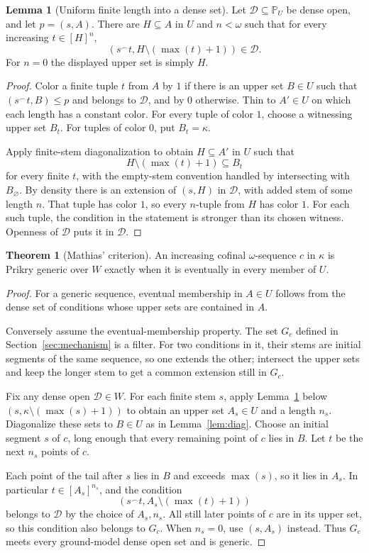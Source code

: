 \documentclass[11pt,letterpaper]{article}
\theoremstyle{definition}
\newtheorem{theorem}[definition]{Theorem}
\newtheorem{lemma}[definition]{Lemma}
\numberwithin{equation}{section}
\begin{document}
\begin{lemma}[Uniform finite length into a dense set]\label{lem:strongprikry}
Let $\mathcal D\subseteq\mathbb P_U$ be dense open, and let $p=(s,A)$. There are $H\subseteq A$ in $U$ and $n<\omega$ such that for every increasing $t\in[H]^n$,
\[
 (s^\frown t,H\setminus(\max(t)+1))\in\mathcal D.
\]
For $n=0$ the displayed upper set is simply $H$.
\end{lemma}
\begin{proof}
Color a finite tuple $t$ from $A$ by $1$ if there is an upper set $B\in U$ such that $(s^\frown t,B)\le p$ and belongs to $\mathcal D$, and by $0$ otherwise. Thin to $A'\in U$ on which each length has a constant color. For every tuple of color $1$, choose a witnessing upper set $B_t$. For tuples of color $0$, put $B_t=\kappa$.

Apply finite-stem diagonalization to obtain $H\subseteq A'$ in $U$ such that
\[
 H\setminus(\max(t)+1)\subseteq B_t
\]
for every finite $t$, with the empty-stem convention handled by intersecting with $B_\varnothing$. By density there is an extension of $(s,H)$ in $\mathcal D$, with added stem of some length $n$. That tuple has color $1$, so every $n$-tuple from $H$ has color $1$. For each such tuple, the condition in the statement is stronger than its chosen witness. Openness of $\mathcal D$ puts it in $\mathcal D$.
\end{proof}

\begin{theorem}[Mathias' criterion]\label{thm:mathias}
An increasing cofinal $\omega$-sequence $c$ in $\kappa$ is Prikry generic over $W$ exactly when it is eventually in every member of $U$.
\end{theorem}
\begin{proof}
For a generic sequence, eventual membership in $A\in U$ follows from the dense set of conditions whose upper sets are contained in $A$.

Conversely assume the eventual-membership property. The set $G_c$ defined in Section~\ref{sec:mechanism} is a filter. For two conditions in it, their stems are initial segments of the same sequence, so one extends the other; intersect the upper sets and keep the longer stem to get a common extension still in $G_c$.

Fix any dense open $\mathcal D\in W$. For each finite stem $s$, apply Lemma~\ref{lem:strongprikry} below $(s,\kappa\setminus(\max(s)+1))$ to obtain an upper set $A_s\in U$ and a length $n_s$. Diagonalize these sets to $B\in U$ as in Lemma~\ref{lem:diag}. Choose an initial segment $s$ of $c$, long enough that every remaining point of $c$ lies in $B$. Let $t$ be the next $n_s$ points of $c$.

Each point of the tail after $s$ lies in $B$ and exceeds $\max(s)$, so it lies in $A_s$. In particular $t\in[A_s]^{n_s}$, and the condition
\[
 (s^\frown t,A_s\setminus(\max(t)+1))
\]
belongs to $\mathcal D$ by the choice of $A_s,n_s$. All still later points of $c$ are in its upper set, so this condition also belongs to $G_c$. When $n_s=0$, use $(s,A_s)$ instead. Thus $G_c$ meets every ground-model dense open set and is generic.
\end{proof}
\end{document}
